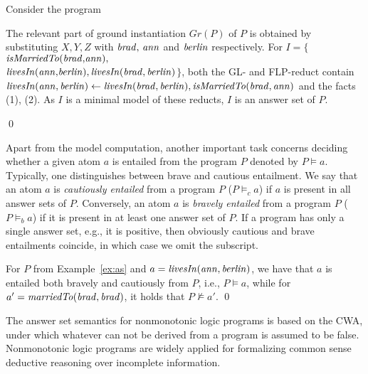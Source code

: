 \begin{example}\label{ex:as}
Consider the program \\
{\small {}}
            
\normalsize
{\smallskip

\noindent            
The relevant part of ground instantiation $Gr(P)$ of $P$ is obtained by substituting $X,Y,Z$ with $\mathit{brad, \,ann}$ and $\mathit{berlin}$ respectively. For $I=\{${\small$\mathit{isMarriedTo(brad{,}ann){,}}$\\$\mathit{livesIn(ann{,}berlin)},\mathit{livesIn(brad,berlin)}$}$\}$, both the GL- and FLP-reduct contain \\\small{$\mathit{livesIn(ann,berlin)}\leftarrow \mathit{livesIn(brad,berlin),isMarriedTo(brad,ann)}$} \normalsize{and the facts (1), (2). As $I$ is a minimal model of these reducts, $I$ is an answer set of $P$.}}\qed
\end{example}
\normalsize

Apart from the model computation, another important task concerns deciding whether a given atom $a$ is entailed from the program $P$ denoted by $P \models a$. Typically, one distinguishes between brave and cautious entailment. We say that an atom $a$ is \emph{cautiously entailed} from a program $P$ ($P \models_c a$) if $a$ is present in all answer sets of $P$. Conversely, an atom $a$ is \emph{bravely entailed} from a program $P$ ($P \models_b a$) if it is present in at least one answer set of $P$. If a program has only a single answer set, e.g., it is positive, then obviously cautious and brave entailments coincide, in which case we omit the subscript.

\begin{example}
For $P$ from Example~\ref{ex:as} and $a=\mathit{livesIn(ann,berlin)}$, we have that $a$ is entailed both bravely and cautiously from $P$, i.e., $P\models a$, while for $a'=\mathit{marriedTo(brad,brad)}$, it holds that $P \not \models a'$. \qed
\end{example}

The answer set semantics for nonmonotonic logic programs is based on the CWA, under which whatever can not be derived from a program is assumed to be false. Nonmonotonic logic programs are widely applied for formalizing common sense deductive reasoning over incomplete information.



